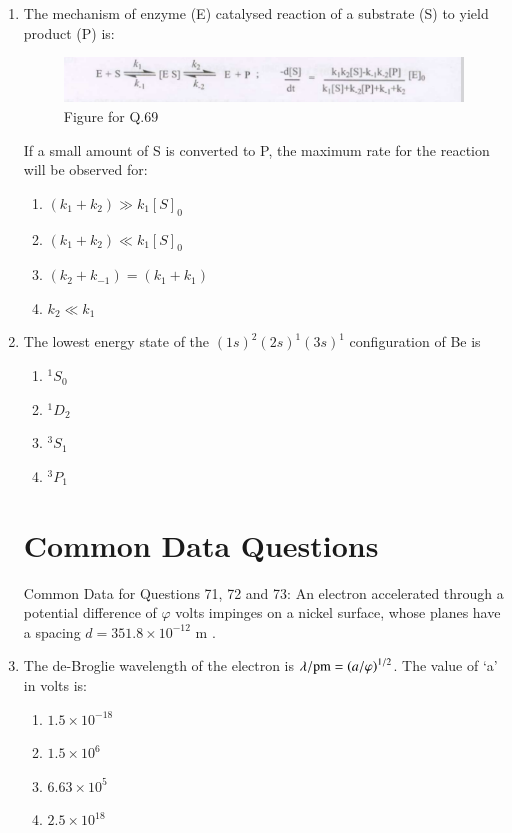 \documentclass[12pt]{article}
\begin{document}
\begin{enumerate}
\item
The mechanism of enzyme (E) catalysed reaction of a substrate (S) to yield product (P) is:

\begin{figure}[H]
\includegraphics[width=0.6\columnwidth]{figs/q69.png}
\caption{Figure for Q.69}
    \label{fig:q69}
\end{figure}

If a small amount of S is converted to P, the maximum rate for the reaction will be observed for:

\begin{enumerate}
\item   $(k_1 + k_2) \gg k_1 [S]_0$
\item   $(k_1 + k_2) \ll k_1 [S]_0$ 
\item   $(k_2 + k_{-1}) = (k_1 + k_1)$ 
\item   $k_2 \ll k_1$
\end{enumerate}    \hfill{}


\item The lowest energy state of the $(1s)^2(2s)^1(3s)^1$ configuration of Be is

\begin{enumerate}
\item $^1S_0$
\item $^1D_2$
\item $^3S_1$
\item $^3P_1$
\end{enumerate}    \hfill{}



\section*{Common Data Questions}

{Common Data for Questions 71, 72 and 73:} 
An electron accelerated through a potential difference of $\varphi$ volts impinges on a nickel surface, whose  planes have a spacing $d = 351.8 \times 10^{-12}$ m .


    \item The de-Broglie wavelength of the electron is $\lambda/\text{pm} = \left(a/\varphi\right)^{1/2}$. The value of ‘a’ in volts is:
    \begin{enumerate}
        \item $1.5 \times 10^{-18}$
        \item $1.5 \times 10^6$
        \item $6.63 \times 10^5$
        \item $2.5 \times 10^{18}$
    \end{enumerate}    \hfill{}



\end{enumerate}
\end{document}
